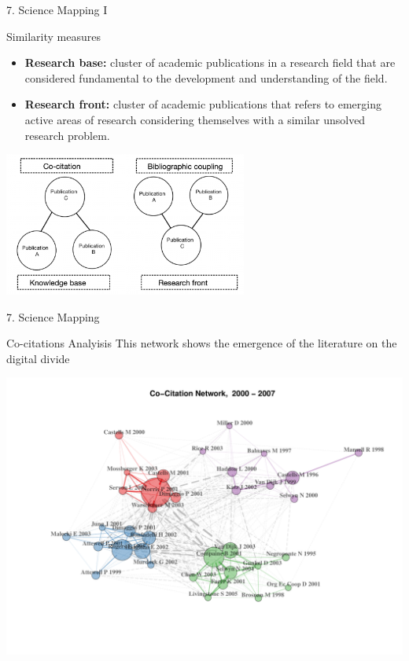 \documentclass[
  ignorenonframetext,
]{beamer}
\begin{document}
\begin{frame}{7. Science Mapping I}
\begin{block}{Similarity measures}
\begin{itemize}
\item
  \textbf{Research base:} cluster of academic publications in a research
  field that are considered fundamental to the development and
  understanding of the field.
\item
  \textbf{Research front:} cluster of academic publications that refers
  to emerging active areas of research considering themselves with a
  similar unsolved research problem.
\end{itemize}

\begin{center}
\includegraphics[width=0.6\textwidth]{pic_1.png}
\end{center}
\end{block}
\end{frame}

\begin{frame}{7. Science Mapping}
\protect\hypertarget{science-mapping}{}
\vspace{0.5cm}

\begin{block}{Co-citations Analyisis}
\protect\hypertarget{co-citations-analyisis}{}
This network shows the emergence of the literature on the digital divide

\includegraphics{Presentation_bibliometric_files/figure-beamer/Co_cite_P1-1.pdf}
\end{block}
\end{frame}
\end{document}
